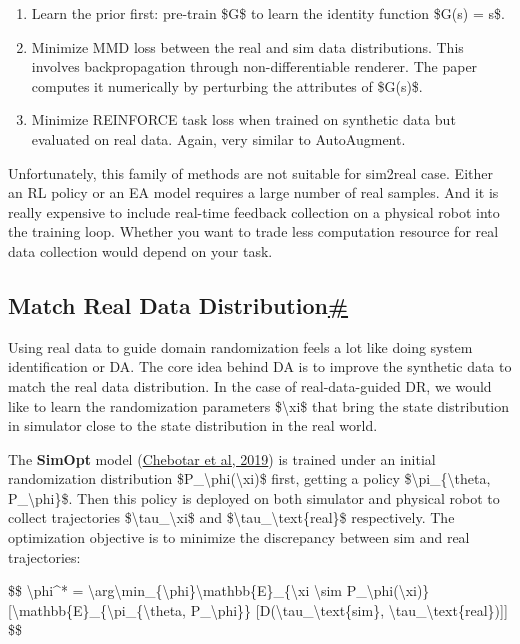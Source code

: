 \begin{enumerate}
\tightlist
\item
  Learn the prior first: pre-train \$G\$ to learn the identity function \$G(s) = s\$.
\item
  Minimize MMD loss between the real and sim data distributions. This involves backpropagation through non-differentiable renderer. The paper computes it numerically by perturbing the attributes of \$G(s)\$.
\item
  Minimize REINFORCE task loss when trained on synthetic data but evaluated on real data. Again, very similar to AutoAugment.
\end{enumerate}

Unfortunately, this family of methods are not suitable for sim2real case. Either an RL policy or an EA model requires a large number of real samples. And it is really expensive to include real-time feedback collection on a physical robot into the training loop. Whether you want to trade less computation resource for real data collection would depend on your task.

\subsection{\texorpdfstring{Match Real Data Distribution\hyperref[match-real-data-distribution]{\#}}{Match Real Data Distribution\#}}\label{match-real-data-distribution}

Using real data to guide domain randomization feels a lot like doing system identification or DA. The core idea behind DA is to improve the synthetic data to match the real data distribution. In the case of real-data-guided DR, we would like to learn the randomization parameters \$\textbackslash xi\$ that bring the state distribution in simulator close to the state distribution in the real world.

The \textbf{SimOpt} model (\href{https://arxiv.org/abs/1810.05687}{Chebotar et al, 2019}) is trained under an initial randomization distribution \$P\_\textbackslash phi(\textbackslash xi)\$ first, getting a policy \$\textbackslash pi\_\{\textbackslash theta, P\_\textbackslash phi\}\$. Then this policy is deployed on both simulator and physical robot to collect trajectories \$\textbackslash tau\_\textbackslash xi\$ and \$\textbackslash tau\_\textbackslash text\{real\}\$ respectively. The optimization objective is to minimize the discrepancy between sim and real trajectories:

\$\$ \textbackslash phi\^{}* = \textbackslash arg\textbackslash min\_\{\textbackslash phi\}\textbackslash mathbb\{E\}\_\{\textbackslash xi \textbackslash sim P\_\textbackslash phi(\textbackslash xi)\} {[}\textbackslash mathbb\{E\}\_\{\textbackslash pi\_\{\textbackslash theta, P\_\textbackslash phi\}\} {[}D(\textbackslash tau\_\textbackslash text\{sim\}, \textbackslash tau\_\textbackslash text\{real\}){]}{]} \$\$

